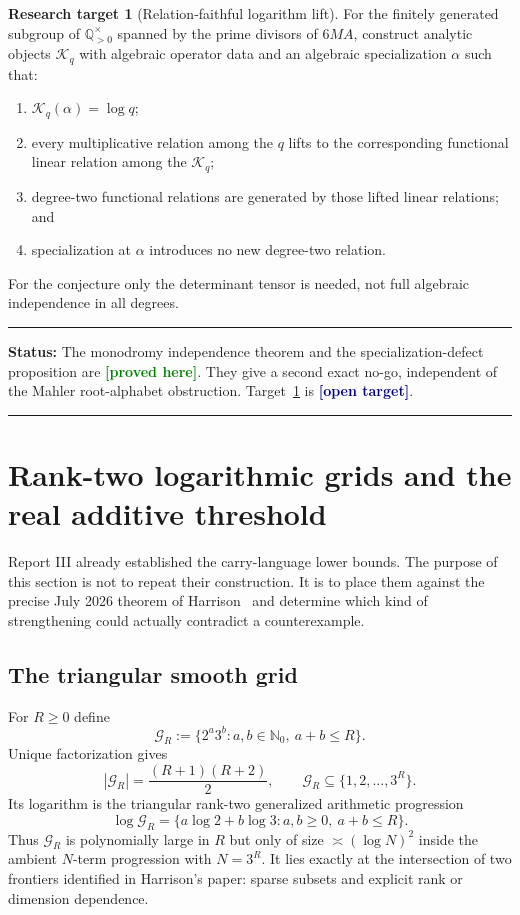\documentclass[11pt,oneside]{article}
\theoremstyle{definition}
\newtheorem{target}[theorem]{Research target}
\theoremstyle{remark}
\newcommand{\Nzero}{\mathbb N_0}
\newcommand{\Q}{\mathbb Q}
\newcommand{\cG}{\mathcal G}
\newcommand{\statusproved}{\textcolor{green}{\textbf{[proved here]}}}
\newcommand{\statustarget}{\textcolor{navy}{\textbf{[open target]}}}
\newenvironment{statusbox}[1]
{\begin{center}\begin{minipage}{0.95\textwidth}\raggedright\hrule
\vspace{0.45em}\textbf{Status:} #1\par\vspace{0.35em}}
{\vspace{0.35em}\hrule\end{minipage}\end{center}}
\begin{document}
\begin{target}[Relation-faithful logarithm lift]
\label{target:relation-faithful-lift}
For the finitely generated subgroup of $\Q_{>0}^{\times}$ spanned by the prime divisors of
$6MA$, construct analytic objects $\mathscr K_q$ with algebraic operator data and an algebraic
specialization $\alpha$ such that:
\begin{enumerate}
\item $\mathscr K_q(\alpha)=\log q$;
\item every multiplicative relation among the $q$ lifts to the corresponding functional linear
relation among the $\mathscr K_q$;
\item degree-two functional relations are generated by those lifted linear relations; and
\item specialization at $\alpha$ introduces no new degree-two relation.
\end{enumerate}
For the conjecture only the determinant tensor is needed, not full algebraic independence in all
degrees.
\end{target}

\begin{statusbox}{The monodromy independence theorem and the specialization-defect proposition
are \statusproved.  They give a second exact no-go, independent of the Mahler root-alphabet
obstruction.  Target~\ref{target:relation-faithful-lift} is \statustarget.}
\end{statusbox}

\section{Rank-two logarithmic grids and the real additive threshold}
\label{sec:harrison}

Report III already established the carry-language lower bounds.  The purpose of this section is
not to repeat their construction.  It is to place them against the precise July 2026 theorem of
Harrison~\cite{Harrison2026} and determine which kind of strengthening could actually contradict
a counterexample.

\subsection{The triangular smooth grid}

For $R\ge0$ define
\begin{equation}
  \cG_R:=\{2^a3^b:a,b\in\Nzero,\ a+b\le R\}.
  \label{eq:smooth-grid}
\end{equation}
Unique factorization gives
\begin{equation}
  |\cG_R|=\frac{(R+1)(R+2)}2,
  \qquad
  \cG_R\subseteq\{1,2,\ldots,3^R\}.
  \label{eq:smooth-grid-size}
\end{equation}
Its logarithm is the triangular rank-two generalized arithmetic progression
\[
  \log\cG_R=\{a\log2+b\log3:a,b\ge0,\ a+b\le R\}.
\]
Thus $\cG_R$ is polynomially large in $R$ but only of size $\asymp(\log N)^2$ inside the
ambient $N$-term progression with $N=3^R$.  It lies exactly at the intersection of two frontiers
identified in Harrison's paper: sparse subsets and explicit rank or dimension dependence.
\end{document}
